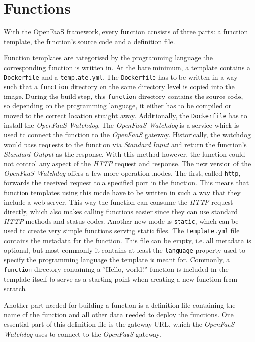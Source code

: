 \section{Functions}

With the OpenFaaS framework, every function consists of three parts: a function template, the
function's source code and a definition file.

Function templates are categorised by the programming language the corresponding function is written
in. At the bare minimum, a template contains a \texttt{Dockerfile} and a \texttt{template.yml}. The
\texttt{Dockerfile} has to be written in a way such that a \texttt{function} directory on the same
directory level is copied into the image. During the build step, this \texttt{function} directory
contains the source code, so depending on the programming language, it either has to be compiled or
moved to the correct location straight away. Additionally, the \texttt{Dockerfile} has to install
the \textit{OpenFaaS Watchdog}. The \textit{OpenFaaS Watchdog} is a service which is used to connect
the function to the \textit{OpenFaaS} gateway. Historically, the watchdog would pass requests to the
function via \textit{Standard Input} and return the function's \textit{Standard Output} as the
response. With this method however, the function could not control any aspect of the \textit{HTTP}
request and response. The new version of the \textit{OpenFaaS Watchdog} offers a few more operation
modes. The first, called \texttt{http}, forwards the received request to a specified port in the
function. This means that function templates using this mode have to be written in such a way that
they include a web server. This way the function can consume the \textit{HTTP} request directly,
which also makes calling functions easier since they can use standard \textit{HTTP} methods and
status codes. Another new mode is \texttt{static}, which can be used to create very simple functions
serving static files. \cite{of-watchdog} The \texttt{template.yml} file contains the metadata for
the function. This file can be empty, i.e. all metadata is optional, but most commonly it contains
at least the \texttt{language} property used to specify the programming language the template is
meant for. \cite{openfaas-build-functions} Commonly, a \texttt{function} directory containing a
“Hello, world!” function is included in the template itself to serve as a starting point when
creating a new function from scratch.

Another part needed for building a function is a definition file containing the name of the function
and all other data needed to deploy the functions. One essential part of this definition file is the
gateway URL, which the \textit{OpenFaaS Watchdog} uses to connect to the \textit{OpenFaaS} gateway.

